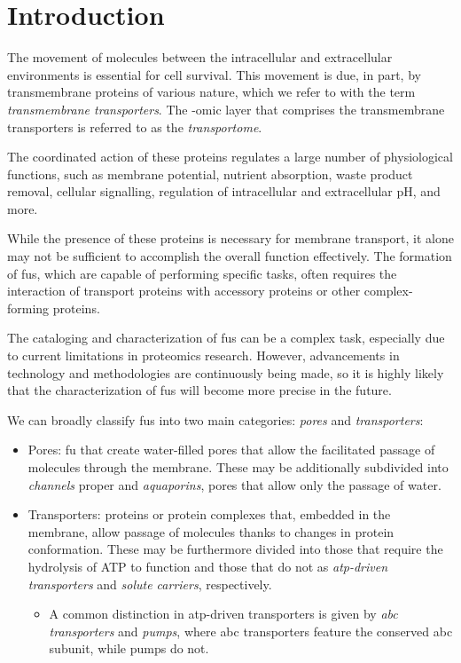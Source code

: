 \section{Introduction}


The movement of molecules between the intracellular and extracellular environments is essential for cell survival.
This movement is due, in part, by transmembrane proteins of various nature, which we refer to with the term \textit{transmembrane transporters}.
The -omic layer that comprises the transmembrane transporters is referred to as the \textit{transportome}.

The coordinated action of these proteins regulates a large number of physiological functions, such as membrane potential, nutrient absorption, waste product removal, cellular signalling, regulation of intracellular and extracellular pH, and more.

While the presence of these proteins is necessary for membrane transport, it alone may not be sufficient to accomplish the overall function effectively.
The formation of \glspl{fu}, which are capable of performing specific tasks, often requires the interaction of transport proteins with accessory proteins or other complex-forming proteins.

The cataloging and characterization of \glspl{fu} can be a complex task, especially due to current limitations in proteomics research.
However, advancements in technology and methodologies are continuously being made, so it is highly likely that the characterization of \glspl{fu} will become more precise in the future.

We can broadly classify \glspl{fu} into two main categories: \textit{pores} and \textit{transporters}:
\begin{itemize}
    \item Pores: \gls{fu} that create water-filled pores that allow the facilitated passage of molecules through the membrane.
    These may be additionally subdivided into \textit{channels} proper and \textit{aquaporins}, pores that allow only the passage of water.
    \item Transporters: proteins or protein complexes that, embedded in the membrane, allow passage of molecules thanks to changes in protein conformation.
    These may be furthermore divided into those that require the hydrolysis of ATP to function and those that do not as \textit{atp-driven transporters} and \textit{solute carriers}, respectively.
    \begin{itemize}
        \item A common distinction in atp-driven transporters is given by \textit{\gls{abc} transporters} and \textit{pumps}, where \gls{abc} transporters feature the conserved \gls{abc} subunit, while pumps do not.
    \end{itemize}
\end{itemize}

